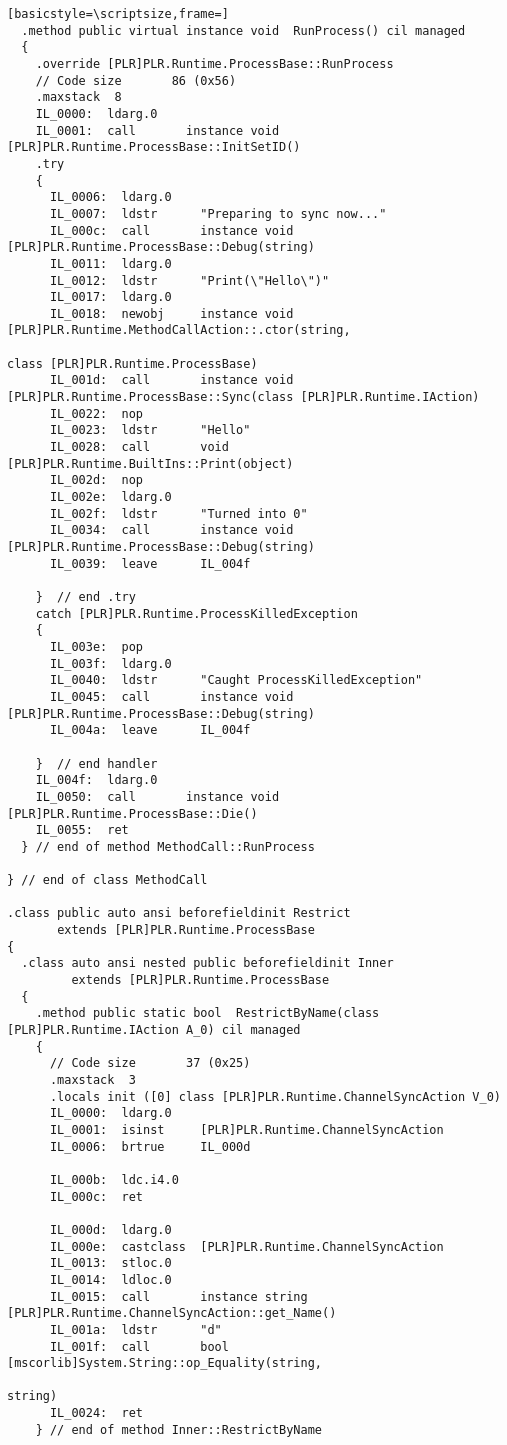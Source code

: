 \begin{lstlisting}[basicstyle=\scriptsize,frame=]
  .method public virtual instance void  RunProcess() cil managed
  {
    .override [PLR]PLR.Runtime.ProcessBase::RunProcess
    // Code size       86 (0x56)
    .maxstack  8
    IL_0000:  ldarg.0
    IL_0001:  call       instance void [PLR]PLR.Runtime.ProcessBase::InitSetID()
    .try
    {
      IL_0006:  ldarg.0
      IL_0007:  ldstr      "Preparing to sync now..."
      IL_000c:  call       instance void [PLR]PLR.Runtime.ProcessBase::Debug(string)
      IL_0011:  ldarg.0
      IL_0012:  ldstr      "Print(\"Hello\")"
      IL_0017:  ldarg.0
      IL_0018:  newobj     instance void [PLR]PLR.Runtime.MethodCallAction::.ctor(string,
                                                                                  class [PLR]PLR.Runtime.ProcessBase)
      IL_001d:  call       instance void [PLR]PLR.Runtime.ProcessBase::Sync(class [PLR]PLR.Runtime.IAction)
      IL_0022:  nop
      IL_0023:  ldstr      "Hello"
      IL_0028:  call       void [PLR]PLR.Runtime.BuiltIns::Print(object)
      IL_002d:  nop
      IL_002e:  ldarg.0
      IL_002f:  ldstr      "Turned into 0"
      IL_0034:  call       instance void [PLR]PLR.Runtime.ProcessBase::Debug(string)
      IL_0039:  leave      IL_004f

    }  // end .try
    catch [PLR]PLR.Runtime.ProcessKilledException 
    {
      IL_003e:  pop
      IL_003f:  ldarg.0
      IL_0040:  ldstr      "Caught ProcessKilledException"
      IL_0045:  call       instance void [PLR]PLR.Runtime.ProcessBase::Debug(string)
      IL_004a:  leave      IL_004f

    }  // end handler
    IL_004f:  ldarg.0
    IL_0050:  call       instance void [PLR]PLR.Runtime.ProcessBase::Die()
    IL_0055:  ret
  } // end of method MethodCall::RunProcess

} // end of class MethodCall

.class public auto ansi beforefieldinit Restrict
       extends [PLR]PLR.Runtime.ProcessBase
{
  .class auto ansi nested public beforefieldinit Inner
         extends [PLR]PLR.Runtime.ProcessBase
  {
    .method public static bool  RestrictByName(class [PLR]PLR.Runtime.IAction A_0) cil managed
    {
      // Code size       37 (0x25)
      .maxstack  3
      .locals init ([0] class [PLR]PLR.Runtime.ChannelSyncAction V_0)
      IL_0000:  ldarg.0
      IL_0001:  isinst     [PLR]PLR.Runtime.ChannelSyncAction
      IL_0006:  brtrue     IL_000d

      IL_000b:  ldc.i4.0
      IL_000c:  ret

      IL_000d:  ldarg.0
      IL_000e:  castclass  [PLR]PLR.Runtime.ChannelSyncAction
      IL_0013:  stloc.0
      IL_0014:  ldloc.0
      IL_0015:  call       instance string [PLR]PLR.Runtime.ChannelSyncAction::get_Name()
      IL_001a:  ldstr      "d"
      IL_001f:  call       bool [mscorlib]System.String::op_Equality(string,
                                                                     string)
      IL_0024:  ret
    } // end of method Inner::RestrictByName


\end{lstlisting}
